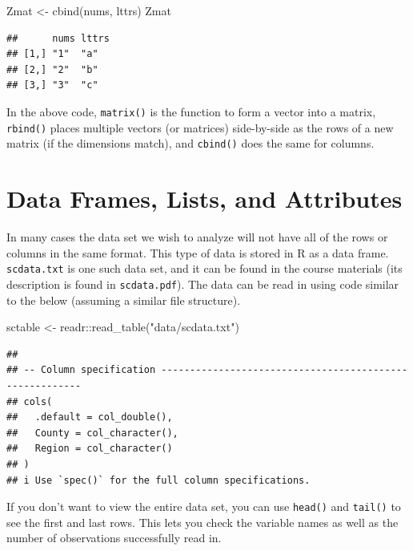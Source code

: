 \documentclass[
]{book}
\newenvironment{Shaded}{\begin{snugshade}}{\end{snugshade}}
\newcommand{\FunctionTok}[1]{\textcolor[rgb]{0.00,0.00,0.00}{#1}}
\newcommand{\NormalTok}[1]{#1}
\newcommand{\OtherTok}[1]{\textcolor[rgb]{0.56,0.35,0.01}{#1}}
\newcommand{\SpecialCharTok}[1]{\textcolor[rgb]{0.00,0.00,0.00}{#1}}
\newcommand{\StringTok}[1]{\textcolor[rgb]{0.31,0.60,0.02}{#1}}
\begin{document}
\begin{Shaded}
\begin{Highlighting}[]
\NormalTok{Zmat }\OtherTok{\textless{}{-}} \FunctionTok{cbind}\NormalTok{(nums, lttrs)}
\NormalTok{Zmat}
\end{Highlighting}
\end{Shaded}

\begin{verbatim}
##      nums lttrs
## [1,] "1"  "a"  
## [2,] "2"  "b"  
## [3,] "3"  "c"
\end{verbatim}

In the above code, \texttt{matrix()} is the function to form a vector into a matrix, \texttt{rbind()} places multiple vectors (or matrices) side-by-side as the rows of a new matrix (if the dimensions match), and \texttt{cbind()} does the same for columns.

\hypertarget{data-frames-lists-and-attributes}{%
\section{Data Frames, Lists, and Attributes}\label{data-frames-lists-and-attributes}}

In many cases the data set we wish to analyze will not have all of the rows or columns in the same format. This type of data is stored in R as a data frame. \texttt{scdata.txt} is one such data set, and it can be found in the course materials (its description is found in \texttt{scdata.pdf}). The data can be read in using code similar to the below (assuming a similar file structure).

\begin{Shaded}
\begin{Highlighting}[]
\NormalTok{sctable }\OtherTok{\textless{}{-}}\NormalTok{ readr}\SpecialCharTok{::}\FunctionTok{read\_table}\NormalTok{(}\StringTok{"data/scdata.txt"}\NormalTok{)}
\end{Highlighting}
\end{Shaded}

\begin{verbatim}
## 
## -- Column specification --------------------------------------------------------
## cols(
##   .default = col_double(),
##   County = col_character(),
##   Region = col_character()
## )
## i Use `spec()` for the full column specifications.
\end{verbatim}

If you don't want to view the entire data set, you can use \texttt{head()} and \texttt{tail()} to see the first and last rows. This lets you check the variable names as well as the number of observations successfully read in.
\end{document}
